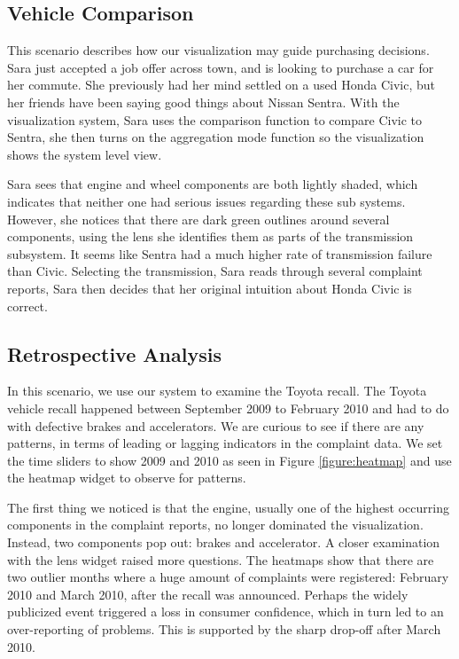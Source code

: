  
\subsection{Vehicle Comparison}
This scenario describes how our visualization may guide purchasing decisions.
Sara just accepted a job offer across town, and is looking to purchase a car 
for her commute. She previously had her mind settled on a used Honda Civic, 
but her friends have been saying good things about Nissan Sentra. With the 
visualization system, Sara uses the comparison function to compare Civic to 
Sentra, she then turns on the aggregation mode function so the visualization 
shows the system level view. 

Sara sees that engine and wheel components are both lightly shaded, which
indicates that neither one had serious issues regarding these sub systems.
However, she notices that there are dark green outlines around several
components, using the lens she identifies them as parts of the transmission subsystem. It seems like Sentra had
a much higher rate of transmission failure than Civic. Selecting the
transmission, Sara reads through several complaint reports, Sara then decides
that her original intuition about Honda Civic is correct.


\subsection{Retrospective Analysis}
In this scenario, we use our system to examine the Toyota recall. The Toyota 
vehicle recall happened between September 2009 to February 2010 and had to
do with defective brakes and accelerators. We are curious to see if there are
any patterns, in terms of leading or lagging indicators in the complaint data.
We set the time sliders to show 2009 and 2010 as seen in Figure \ref{figure:heatmap} 
and use the heatmap widget to observe for patterns.

The first thing we noticed is that the engine, usually one of the highest
occurring components in the complaint reports, no longer dominated
the visualization. Instead, two components pop out: brakes and accelerator.
A closer examination with the lens widget raised more questions.
The heatmaps show that there are two outlier months where a
huge amount of complaints were registered: February 2010 and March
2010, after the recall was announced. Perhaps the widely publicized
event triggered a loss in consumer confidence, which in turn led to an
over-reporting of problems. This is supported by the sharp drop-off
after March 2010.

